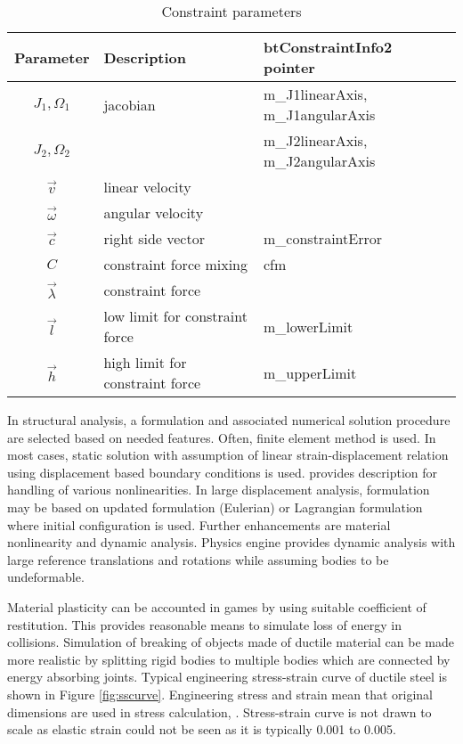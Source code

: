 \begin {table}[htb!]
\begin{center}
\begin{tabular}{|c| l| l|}
\hline
{\bf Parameter} & {\bf Description} & {\bf btConstraintInfo2 pointer}\\  \hline
$J_1, \Omega_1$ & jacobian & m\_J1linearAxis, m\_J1angularAxis \\
$J_2, \Omega_2$ & & m\_J2linearAxis, m\_J2angularAxis \\ \hline
$\vec{v}$ & linear velocity & \\ \hline
$\vec{\omega}$ & angular velocity & \\ \hline
$\vec{c}$        &  right side vector   & m\_constraintError \\ \hline
$C$  & constraint force mixing & cfm \\  \hline
$\vec{\lambda}$ & constraint force &  \\ \hline
$\vec{l}$ & low limit for constraint force & m\_lowerLimit \\ \hline
$\vec{h}$ & high limit for constraint force & m\_upperLimit \\ \hline
\end {tabular}
\end{center}
\caption {Constraint parameters} \label{tab:constraintParameters} 
\end {table}


In structural analysis, a formulation and associated numerical solution procedure are selected 
based on needed features.
Often,  finite element method is used.
In most cases, static solution with assumption of linear strain-displacement relation
using displacement based boundary conditions is used.
\citet{bathe-1975} provides description for handling of various nonlinearities.
In large displacement analysis, formulation may be based on updated formulation (Eulerian) or
Lagrangian formulation where initial configuration is used.
Further enhancements are material nonlinearity and dynamic analysis.
Physics engine provides dynamic analysis with large reference translations and rotations
while assuming bodies to be undeformable.

Material plasticity can be accounted in games by using suitable coefficient of restitution.
This provides reasonable means to simulate loss of energy in collisions.
Simulation of breaking of objects made of ductile material can be made more realistic by splitting rigid bodies
to multiple bodies which are connected by energy absorbing joints.
Typical engineering stress-strain curve of ductile steel is shown in Figure \ref{fig:sscurve}.
Engineering stress and strain mean that original dimensions are used in stress calculation,
\citet[p.~108]{dowling}.
Stress-strain curve is not drawn to scale as elastic strain could not be seen as it is typically 0.001 to 0.005.

